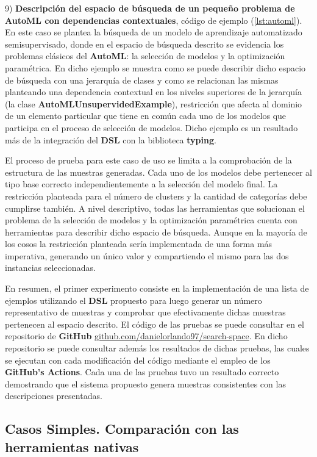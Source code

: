 9) {\bf Descripción del espacio de búsqueda de un pequeño problema de AutoML con dependencias contextuales}, código de ejemplo (\ref{lst:automl}). En este caso se plantea la
búsqueda de un modelo de aprendizaje automatizado semisupervisado, donde en el espacio de búsqueda descrito se evidencia los
problemas clásicos del {\bf AutoML}: la selección de modelos y la optimización paramétrica. En dicho ejemplo se muestra como se puede
describir dicho espacio de búsqueda con una jerarquía de clases y como se relacionan las mismas planteando una dependencia contextual
en los niveles superiores de la jerarquía (la clase {\bf AutoMLUnsupervidedExample}), restricción que afecta al dominio de un elemento
particular que tiene en común cada uno de los modelos que participa en el proceso de selección de modelos. Dicho ejemplo es un
resultado más de la integración del {\bf DSL} con la biblioteca {\bf typing}.

El proceso de prueba para este caso de uso se limita a la comprobación de la estructura de las muestras generadas. Cada uno de
los modelos debe pertenecer al tipo base correcto independientemente a la
selección del modelo final. La restricción planteada para el número de clusters y la cantidad de categorías debe cumplirse también.
A nivel descriptivo, todas las herramientas que solucionan el problema de la selección de modelos y la optimización paramétrica
cuenta con herramientas para describir dicho espacio de búsqueda. Aunque en la mayoría de los cosos la restricción planteada sería
implementada de una forma más imperativa, generando un único valor y compartiendo el mismo para las dos instancias seleccionadas.

En resumen, el primer experimento consiste en la implementación de una lista de ejemplos utilizando el {\bf DSL} propuesto para luego generar
un número representativo de muestras y comprobar que efectivamente dichas muestras pertenecen al espacio descrito. El código de las
pruebas se puede consultar en el repositorio de {\bf GitHub} \href{https://github.com/danielorlando97/search-space}{github.com/danielorlando97/search-space}. 
En dicho repositorio se puede consultar además los
resultados de dichas pruebas, las cuales se ejecutan con cada modificación del código mediante el empleo de los {\bf GitHub's Actions}.
Cada una de las pruebas tuvo un resultado correcto demostrando que el sistema propuesto genera muestras consistentes con las descripciones presentadas.

\subsection{Casos Simples. Comparación con las herramientas nativas}


